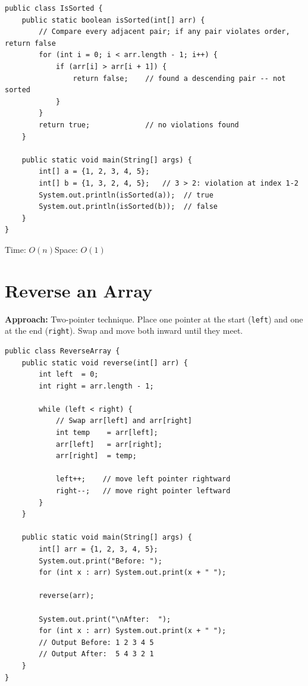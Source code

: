 \documentclass[12pt,a4paper,oneside]{book}
\begin{document}
\begin{lstlisting}[caption={Is the array sorted in ascending order?}]
public class IsSorted {
    public static boolean isSorted(int[] arr) {
        // Compare every adjacent pair; if any pair violates order, return false
        for (int i = 0; i < arr.length - 1; i++) {
            if (arr[i] > arr[i + 1]) {
                return false;    // found a descending pair -- not sorted
            }
        }
        return true;             // no violations found
    }

    public static void main(String[] args) {
        int[] a = {1, 2, 3, 4, 5};
        int[] b = {1, 3, 2, 4, 5};   // 3 > 2: violation at index 1-2
        System.out.println(isSorted(a));  // true
        System.out.println(isSorted(b));  // false
    }
}
\end{lstlisting}

\begin{complexity}
Time: $O(n)$\quad Space: $O(1)$
\end{complexity}

\section{Reverse an Array}

\textbf{Approach:} Two-pointer technique. Place one pointer at the start (\texttt{left}) and one at the end (\texttt{right}). Swap and move both inward until they meet.

\begin{lstlisting}[caption={Reverse Array --- Two Pointer, in-place}]
public class ReverseArray {
    public static void reverse(int[] arr) {
        int left  = 0;
        int right = arr.length - 1;

        while (left < right) {
            // Swap arr[left] and arr[right]
            int temp    = arr[left];
            arr[left]   = arr[right];
            arr[right]  = temp;

            left++;    // move left pointer rightward
            right--;   // move right pointer leftward
        }
    }

    public static void main(String[] args) {
        int[] arr = {1, 2, 3, 4, 5};
        System.out.print("Before: ");
        for (int x : arr) System.out.print(x + " ");

        reverse(arr);

        System.out.print("\nAfter:  ");
        for (int x : arr) System.out.print(x + " ");
        // Output Before: 1 2 3 4 5
        // Output After:  5 4 3 2 1
    }
}
\end{lstlisting}
\end{document}
